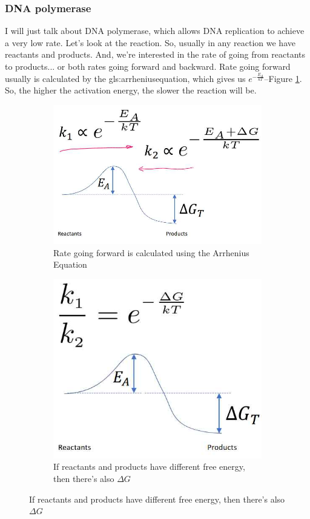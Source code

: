 \documentclass[]{article}
\begin{document}
\subsubsection{DNA polymerase}
I will just talk about DNA polymerase,
which allows DNA replication
to achieve a very low rate.
Let's look at the reaction.
So, usually in any reaction
we have reactants and products.
And, we're interested in the rate of going
from reactants to products...
or both rates going forward
and backward.
Rate going forward usually is calculated
by the \gls{gls:arrheniusequation},
which gives us $e^{-\frac{E_A}{kT}}$--Figure \ref{fig:ArrheniusEquation}.
So, the higher the activation energy,
the slower the reaction will be.

\begin{figure}[H]
	\caption{The rate of going from reactants to products}
	\begin{subfigure}[t]{0.3\textwidth}
		\caption{Rate going forward is calculated using the Arrhenius Equation}\label{fig:ArrheniusEquation}
		\includegraphics[width=\textwidth]{ArrheniusEquation}
	\end{subfigure}
	\;
	\begin{subfigure}[t]{0.3\textwidth}
		\caption{If reactants and products
			have different free energy,
			then there's also $\Delta G$}\label{fig:ArrheniusEquation2}
		\includegraphics[width=\textwidth]{ArrheniusEquation2}

\end{subfigure}
\end{figure}
\end{document}
